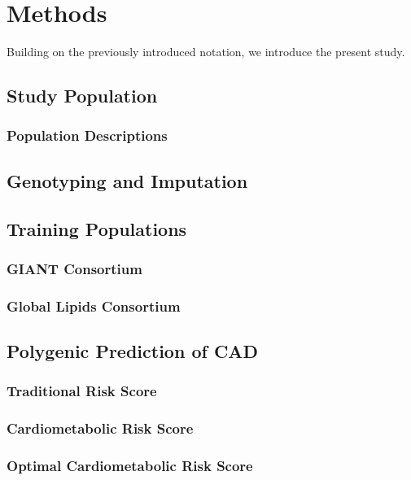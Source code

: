 \chapter{Methods}
\label{methods}

Building on the previously introduced notation, we introduce the present study.

\section{Study Population}

\subsection{Population Descriptions}

\section{Genotyping and Imputation}


\section{Training Populations}

\subsection{GIANT Consortium}

\subsection{Global Lipids Consortium}

\section{Polygenic Prediction of CAD}

\subsection{Traditional Risk Score}

\subsection{Cardiometabolic Risk Score}

\subsection{Optimal Cardiometabolic Risk Score}

